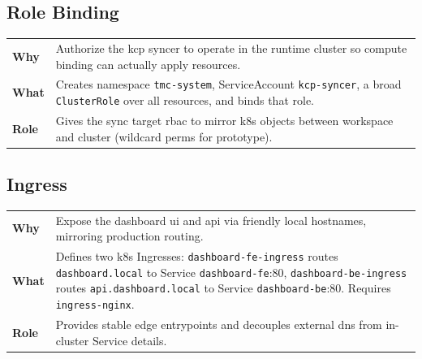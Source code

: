 \documentclass[11pt, a4paper, oneside, listof=totoc]{scrartcl}
\makeatletter
\newcommand{\codesummary}[3]{%
    \vspace{0.4\baselineskip}%
    \noindent\begin{tabularx}{\linewidth}{@{}>{\bfseries}l X@{}}
    Why  & #1\\
    What & #2\\
    Role & #3\\
    \end{tabularx}%
    \vspace{0.2\baselineskip}%
}
\makeatother
\begin{document}
            \subsection{Role Binding}
                \codesummary
                    {Authorize the \gls{kcp} syncer to operate in the runtime cluster so compute binding can actually apply resources.}
                    {Creates namespace \texttt{tmc-system}, ServiceAccount \texttt{kcp-syncer}, a broad \texttt{ClusterRole} over all resources, and binds that role.}
                    {Gives the sync target \gls{rbac} to mirror \gls{k8s} objects between workspace and cluster (wildcard perms for prototype).}

        \clearpage     

            \subsection{Ingress}
                \codesummary
                    {Expose the dashboard \gls{ui} and \gls{api} via friendly local hostnames, mirroring production routing.}
                    {Defines two \gls{k8s} Ingresses: \texttt{dashboard-fe-ingress} routes \texttt{dashboard.local} to Service \texttt{dashboard-fe}:80, \texttt{dashboard-be-ingress} routes \texttt{api.dashboard.local} to Service \texttt{dashboard-be}:80. Requires \texttt{ingress-nginx}.}
                    {Provides stable edge entrypoints and decouples external \gls{dns} from in-cluster Service details.}
\end{document}
